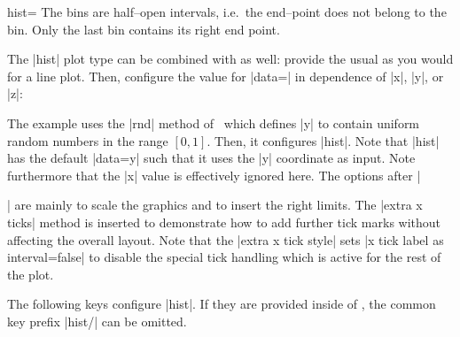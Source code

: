 \begin{plottype}[/pgfplots]{hist=\textcolor{black}{\normalfont{}}}
	The bins are half--open intervals, i.e.\ the end--point does not belong to the bin. Only the last bin contains its right end point.
\pgfplotsexpensiveexample
\begin{codeexample}[]
\begin{tikzpicture}
\begin{axis}[
  ybar interval,
  xtick=,%
  xticklabel=
    {$[\pgfmathprintnumber\tick,%
	   \pgfmathprintnumber\nexttick)$}
]
\addplot+[hist={data=x}]
	file {plotdata/pgfplots.randn.dat};
	
\end{axis}
\end{tikzpicture}
\end{codeexample}

	The |hist| plot type can be combined with  as well: provide the usual  as you would for a line plot. Then, configure the value for |data=| in dependence of |x|, |y|, or |z|: 
\begin{codeexample}[]
\begin{tikzpicture}
\begin{axis}[
  tiny,
  height=4cm,width=12cm,
  ybar interval,
  ymin=0,
  xmin=0,xmax=1,
  axis on top,
  extra x ticks={0,1},
  extra x tick style={
    grid=none,
    x tick label as interval=false,
    xticklabel=$\pgfmathprintnumber\tick$
  },
  xticklabel={$[\pgfmathprintnumber[fixed]\tick,\cdot)$}
]
	\addplot+[samples=200,hist] {rnd};
\end{axis}
\end{tikzpicture}
\end{codeexample}
	\noindent The example uses the |rnd| method of \pgfname\ which defines |y| to contain uniform random numbers in the range $[0,1]$. Then, it configures |hist|. Note that |hist| has the default |data=y| such that it uses the |y| coordinate as input. Note furthermore that the |x| value is effectively ignored here. The options after |\begin{axis}[...]| are mainly to scale the graphics and to insert the right limits. The |extra x ticks| method is inserted to demonstrate how to add further tick marks without affecting the overall layout. Note that the |extra x tick style| sets |x tick label as interval=false| to disable the special tick handling which is active for the rest of the plot.

	The following keys configure |hist|. If they are provided inside of , the common key prefix |hist/| can be omitted.


\end{axis}
\end{plottype}
